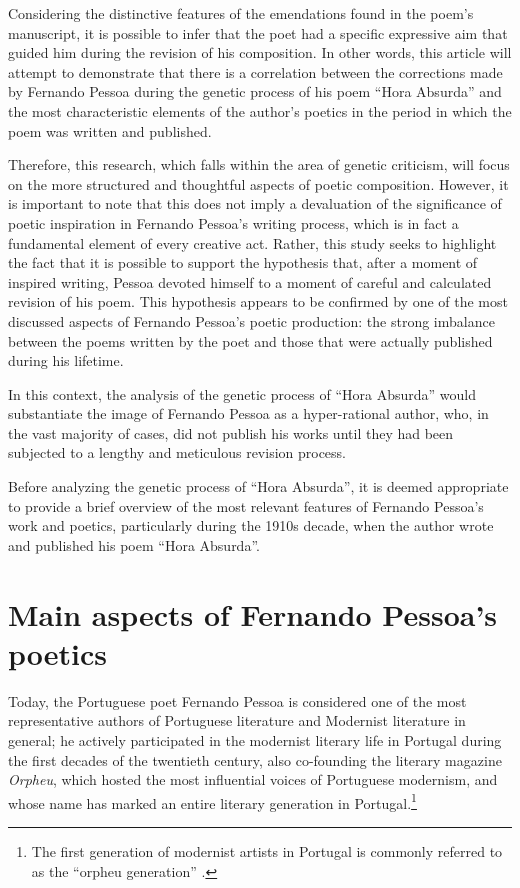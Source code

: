 \documentclass{article}
\begin{document}
Considering the distinctive features of the emendations found in the
poem's manuscript, it is possible to infer that the poet had a specific
expressive aim that guided him during the revision of his composition.
In other words, this article will attempt to demonstrate that there is a
correlation between the corrections made by Fernando Pessoa during the
genetic process of his poem ``Hora Absurda'' and the most characteristic
elements of the author's poetics in the period in which the poem was
written and published.

Therefore, this research, which falls within the area of genetic
criticism, will focus on the more structured and thoughtful aspects of
poetic composition. However, it is important to note that this does not
imply a devaluation of the significance of poetic inspiration in Fernando
Pessoa's writing process, which is in fact a fundamental element of
every creative act. Rather, this study seeks to highlight the fact that
it is possible to support the hypothesis that, after a moment of
inspired writing, Pessoa devoted himself to a moment of careful and
calculated revision of his poem. This hypothesis appears to be confirmed
by one of the most discussed aspects of Fernando Pessoa's poetic
production: the strong imbalance between the poems written by the poet
and those that were actually published during his lifetime.

In this context, the analysis of the genetic process of ``Hora Absurda''
would substantiate the image of Fernando Pessoa as a hyper-rational
author, who, in the vast majority of cases, did not publish his works
until they had been subjected to a lengthy and meticulous revision
process.

Before analyzing the genetic process of ``Hora Absurda'', it is deemed
appropriate to provide a brief overview of the most relevant features of
Fernando Pessoa's work and poetics, particularly during the 1910s
decade, when the author wrote and published his poem ``Hora Absurda''.

\section{Main aspects of Fernando Pessoa's poetics}

Today, the Portuguese poet Fernando Pessoa is considered one of the most
representative authors of Portuguese literature and Modernist literature
in general; he actively participated in the modernist literary life in
Portugal during the first decades of the twentieth century, also co-founding
the literary magazine \emph{Orpheu}, which hosted the most influential
voices of Portuguese modernism, and whose name has marked an entire
literary generation in Portugal.\footnote{The first generation of
  modernist artists in Portugal is commonly referred to as the ``orpheu
  generation'' \parencite{martins_orpheu_1994}.}
\end{document}
